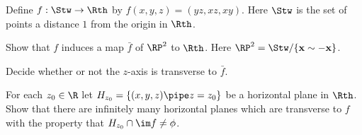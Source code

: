 Define $f:\Stw\rightarrow \Rth$ by $f(x,y,z)=(yz,xz,xy)$. Here $\Stw$
is the set of points a distance $1$ from the origin in $\Rth$.
\begin{alist}
\item Show that $f$ induces a map $\bar{f}$ of $\RP^2$ to $\Rth$. Here
$\RP^2=\Stw/\{\mathbf{x}\sim -\mathbf{x}\}$.
\item Decide whether or not the $z$-axis is transverse to $\bar{f}$.
\item For each $z_0\in \R$ let $H_{z_0}=\{(x,y,z)\pipe z=z_0\}$ be a
horizontal plane in $\Rth$. Show that there are infinitely many
horizontal planes which are transverse to $f$ with the property that
$H_{z_0}\cap
\im f\neq \phi$.
\end{alist}
